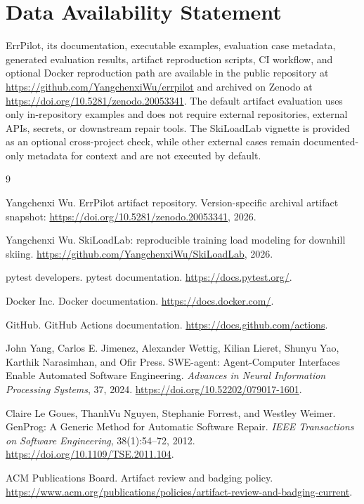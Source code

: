 \documentclass[sigconf]{acmart}
\begin{document}
\section{Data Availability Statement}

ErrPilot, its documentation, executable examples, evaluation case metadata,
generated evaluation results, artifact reproduction scripts, CI workflow, and
optional Docker reproduction path are available in the public repository at
\url{https://github.com/YangchenxiWu/errpilot} and archived on Zenodo at
\url{https://doi.org/10.5281/zenodo.20053341}. The default artifact evaluation
uses only in-repository examples and does not require external repositories,
external APIs, secrets, or downstream repair tools. The SkiLoadLab vignette is
provided as an optional cross-project check, while other external cases remain
documented-only metadata for context and are not executed by default.

\begin{thebibliography}{9}

Yangchenxi Wu.
\newblock ErrPilot artifact repository.
\newblock Version-specific archival artifact snapshot:
\url{https://doi.org/10.5281/zenodo.20053341}, 2026.

Yangchenxi Wu.
\newblock SkiLoadLab: reproducible training load modeling for downhill skiing.
\newblock \url{https://github.com/YangchenxiWu/SkiLoadLab}, 2026.

pytest developers.
\newblock pytest documentation.
\newblock \url{https://docs.pytest.org/}.

Docker Inc.
\newblock Docker documentation.
\newblock \url{https://docs.docker.com/}.

GitHub.
\newblock GitHub Actions documentation.
\newblock \url{https://docs.github.com/actions}.

John Yang, Carlos E. Jimenez, Alexander Wettig, Kilian Lieret, Shunyu Yao,
Karthik Narasimhan, and Ofir Press.
\newblock SWE-agent: Agent-Computer Interfaces Enable Automated Software
Engineering.
\newblock \emph{Advances in Neural Information Processing Systems}, 37, 2024.
\newblock \url{https://doi.org/10.52202/079017-1601}.

Claire Le Goues, ThanhVu Nguyen, Stephanie Forrest, and Westley Weimer.
\newblock GenProg: A Generic Method for Automatic Software Repair.
\newblock \emph{IEEE Transactions on Software Engineering}, 38(1):54--72, 2012.
\newblock \url{https://doi.org/10.1109/TSE.2011.104}.

ACM Publications Board.
\newblock Artifact review and badging policy.
\newblock \url{https://www.acm.org/publications/policies/artifact-review-and-badging-current}.

\end{thebibliography}
\end{document}
